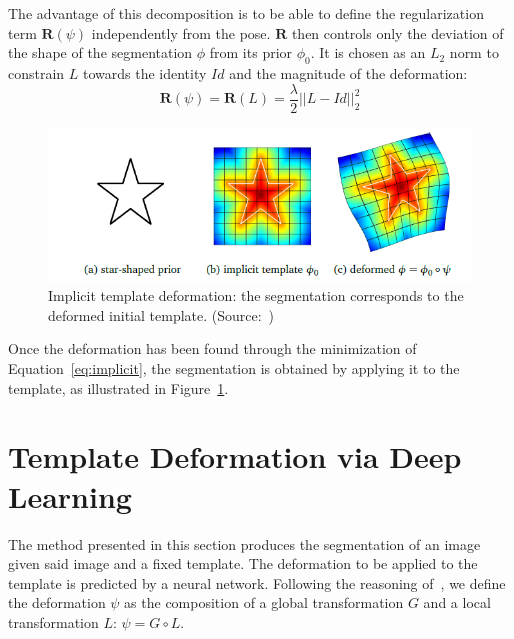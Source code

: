The advantage of this decomposition is to be able to define the regularization term $\mathbf{R} \left( \psi \right)$  independently from the pose. $\mathbf{R}$ then controls only the deviation of the shape of the segmentation $\phi$ from its prior $\phi_0$. It is chosen as an $L_2$ norm to constrain $L$ towards the identity $Id$ and the magnitude of the deformation:
\begin{equation}
    \mathbf{R} \left( \psi \right) = \mathbf{R} \left( L \right) = \frac{\lambda}{2} || L - Id ||^2_2
\end{equation}

\begin{figure}[htbp]
	\includegraphics[width=\textwidth]{img_seg/implicit}
    \caption{Implicit template deformation: the segmentation corresponds to the deformed initial template. (Source:~\textcite{mory2011})}
    \label{fig:implicit}
\end{figure}

Once the deformation has been found through the minimization of Equation~\ref{eq:implicit}, the segmentation is obtained by applying it to the template, as illustrated in Figure~\ref{fig:implicit}.

\section{Template Deformation via Deep Learning}
\label{sec:deformable_dl}

The method presented in this section produces the segmentation of an image given said image and a fixed template. The deformation to be applied to the template is predicted by a neural network. Following the reasoning of~\textcite{mory2012MICCAI}, we define the deformation $\psi$ as the composition of a global transformation $G$ and a local transformation $L$: $\psi = G \circ L$.

